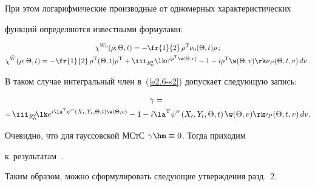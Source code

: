 При этом логарифмические производные от одномерных характеристических 

функций определяются известными формулами:



\noindent

   \begin{gather*}

    \chi^{W_0} (\rho; \Theta, t) = -\fr{1}{2}\, \rho^{\mathrm{T}} \nu_0  (\Theta, t) 

    \rho\,;

    \\

    \chi^{\bar W} (\rho;\Theta,t) = - \fr{1}{2}\, \rho^{\mathrm{T}}  (\Theta, t) 

    \rho^{\mathrm{T}}+ \iii_{R_0^q} \lk e^{i\rho^{\mathrm{T}} \w (\Theta, v)} -1- 

    i\rho^{\mathrm{T}} \w (\Theta, v)\rk \nu_P  (\Theta, t,v)\,dv\,.


    \end{gather*}

В таком случае интегральный член в~(\ref{e2.6-s2}) допускает следующую запись:



\vspace*{-4pt}



\noindent

\begin{multline}

\gamma = {}\\

\!\!{}=\!\iii_{R_0^q}\! \lk e^{ i\la^{\mathrm{T}} \psi'' \left(X_t, Y_t, \Theta, t\right)

\w(\Theta, v)} - 1- i\la^{\mathrm{T}} \psi'' \left(X_t, Y_t, \Theta, t\right)\w 

(\Theta, v)\rk\!\nu_P  (\Theta, t,v)\,dv.\!\label{e2.12-s2}

\end{multline}



Очевидно, что для гауссовской МСтС $\gamma \hm\equiv 0$. Тогда приходим 

к~результатам~\cite{8-s2}.



Таким образом, можно сформулировать следующие утверждения разд.~2.



\smallskip



